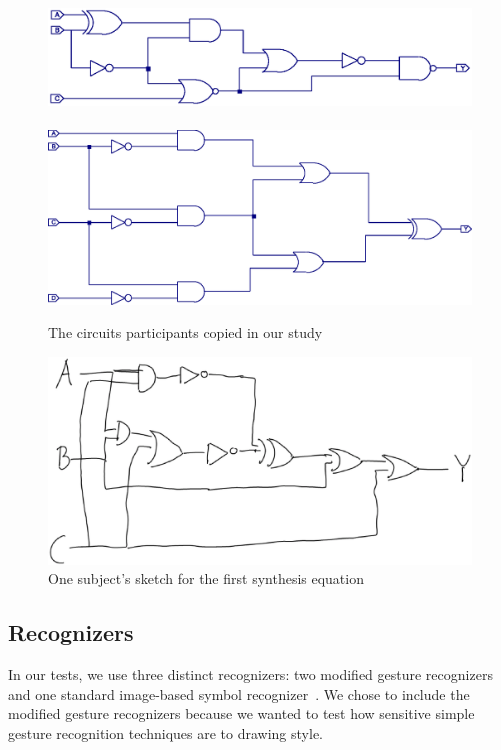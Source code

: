 \documentclass[final,5p,twocolumn]{elsarticle}
\begin{document}
\begin{figure}
\mbox{
\includegraphics[width=1.0\hsize]{circuit_1.eps}}
\mbox{
\includegraphics[width=1.0\hsize]{circuit_2.eps}}
\caption{The circuits participants copied in our study}
\label{copyFig}
\end{figure}

\begin{figure}
\includegraphics[width=1.0\hsize]{eqDrawing.eps}
\caption{One subject's sketch for the first synthesis equation}
\label{synthFig}
\end{figure}

\subsection{Recognizers}
In our tests, we use three distinct recognizers: two modified gesture
recognizers\cite{rubine,dollar} and one standard image-based symbol
recognizer~\cite{Kara2005ImageBased}.  We chose to include the
modified gesture recognizers because we wanted to test how sensitive
simple gesture recognition techniques are to drawing style.
\end{document}
